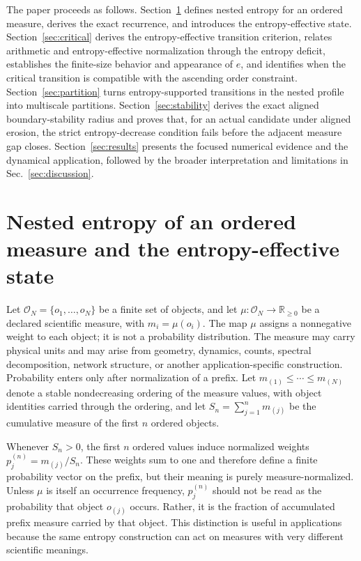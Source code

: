 \documentclass[aip,cha,reprint,superscriptaddress,floatfix]{revtex4-2}
\theoremstyle{definition}
\theoremstyle{remark}
\newcommand{\cO}{\mathcal O}
\newcommand{\Rplus}{\mathbb R_{\ge 0}}
\begin{document}
The paper proceeds as follows. Section~\ref{sec:nested} defines nested entropy for an ordered measure, derives the exact recurrence, and introduces the entropy-effective state. Section~\ref{sec:critical} derives the entropy-effective transition criterion, relates arithmetic and entropy-effective normalization through the entropy deficit, establishes the finite-size behavior and appearance of \(e\), and identifies when the critical transition is compatible with the ascending order constraint. Section~\ref{sec:partition} turns entropy-supported transitions in the nested profile into multiscale partitions. Section~\ref{sec:stability} derives the exact aligned boundary-stability radius and proves that, for an actual candidate under aligned erosion, the strict entropy-decrease condition fails before the adjacent measure gap closes. Section~\ref{sec:results} presents the focused numerical evidence and the dynamical application, followed by the broader interpretation and limitations in Sec.~\ref{sec:discussion}.

\section{Nested entropy of an ordered measure and the entropy-effective state}
\label{sec:nested}

Let \(\cO_N=\{o_1,\ldots,o_N\}\) be a finite set of objects, and let \(\mu:\cO_N\to\Rplus\) be a declared scientific measure, with \(m_i=\mu(o_i)\). The map \(\mu\) assigns a nonnegative weight to each object; it is not a probability distribution. The measure may carry physical units and may arise from geometry, dynamics, counts, spectral decomposition, network structure, or another application-specific construction. Probability enters only after normalization of a prefix. Let \(m_{(1)}\le\cdots\le m_{(N)}\) denote a stable nondecreasing ordering of the measure values, with object identities carried through the ordering, and let \(S_n=\sum_{j=1}^n m_{(j)}\) be the cumulative measure of the first \(n\) ordered objects. %

Whenever \(S_n>0\), the first \(n\) ordered values induce normalized weights \(p_j^{(n)}=m_{(j)}/S_n\). These weights sum to one and therefore define a finite probability vector on the prefix, but their meaning is purely measure-normalized. Unless \(\mu\) is itself an occurrence frequency, \(p_j^{(n)}\) should not be read as the probability that object \(o_{(j)}\) occurs. Rather, it is the fraction of accumulated prefix measure carried by that object. This distinction is useful in applications because the same entropy construction can act on measures with very different scientific meanings.
\end{document}
